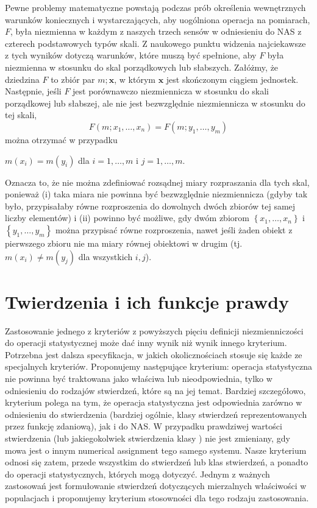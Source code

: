 \documentclass[12pt,a4paper]{report}
\newcommand{\zbior}[1]{\left\lbrace {#1} \right\rbrace }
\begin{document}
Pewne problemy matematyczne powstają podczas prób określenia wewnętrznych warunków koniecznych i wystarczających, aby uogólniona operacja na pomiarach, $F$, była niezmienna w każdym z naszych trzech sensów w odniesieniu do NAS z czterech podstawowych typów skali. Z naukowego punktu widzenia najciekawsze z tych wyników dotyczą warunków, które muszą być spełnione, aby $F$ była niezmienna w stosunku do skal porządkowych lub słabszych. Załóżmy, że dziedzina $F$ to zbiór par $m; \textbf{x}$, w którym $\textbf{x}$ jest skończonym ciągiem jednostek. Następnie, jeśli $F$ jest porównawczo niezmiennicza w stosunku do skali porządkowej lub słabszej, ale nie jest
bezwzględnie niezmiennicza w stosunku do tej skali,
\begin{equation*}
F(m;x_{1},\dots,x_{n})=F(m;y_{1},\dots,y_{m})
\end{equation*}
można otrzymać w przypadku
\begin{center}
$m(x_{i})=m(y_{i})$ dla $i=1,\dots,m$ i $j=1,\dots,m$.
\end{center}
Oznacza to, że nie można zdefiniować rozsądnej miary rozpraszania dla tych skal, ponieważ (i) taka miara nie powinna być bezwzględnie niezmiennicza (gdyby tak było, przypisałaby równe rozproszenia do dowolnych dwóch zbiorów tej samej liczby elementów) i (ii) powinno być możliwe, gdy dwóm zbiorom $\zbior{x_{1},\dots,x_{n}}$  i$\zbior{y_{1},\dots,y_{m}}$ można przypisać równe rozproszenia, nawet jeśli żaden obiekt z pierwszego zbioru nie ma miary równej obiektowi w drugim (tj.$ m(x_{i})\neq m(y_{j})$  dla wszystkich $i, j$).
\section{Twierdzenia i ich funkcje prawdy}

Zastosowanie jednego z kryteriów z powyższych pięciu definicji niezmienniczości do operacji statystycznej może dać inny wynik niż wynik innego kryterium. Potrzebna jest dalsza specyfikacja, w jakich okolicznościach stosuje się każde ze specjalnych kryteriów. Proponujemy następujące kryterium: operacja statystyczna nie powinna być traktowana jako właściwa lub nieodpowiednia, tylko w odniesieniu do rodzajów stwierdzeń, które są na jej temat. Bardziej szczegółowo, kryterium polega na tym, że operacja statystyczna jest odpowiednia zarówno w odniesieniu do stwierdzenia (bardziej ogólnie, klasy stwierdzeń reprezentowanych przez funkcję zdaniową), jak i do NAS. W przypadku prawdziwej wartości stwierdzenia (lub jakiegokolwiek stwierdzenia klasy ) nie jest zmieniany, gdy mowa jest o innym numerical assignment tego samego systemu. Nasze kryterium odnosi się zatem, przede wszystkim do stwierdzeń lub klas stwierdzeń, a ponadto do operacji statystycznych, których mogą dotyczyć.
 Jednym z ważnych zastosowań jest formułowanie stwierdzeń dotyczących mierzalnych właściwości w populacjach i proponujemy kryterium stosowności dla tego rodzaju zastosowania.
\end{document}
